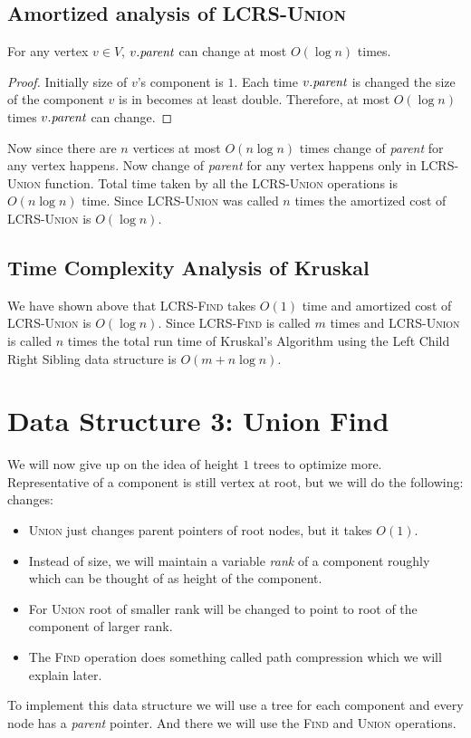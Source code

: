 \subsection{Amortized analysis of \textsc{LCRS-Union}}
\begin{lemma}{}{}
	For any vertex $v\in V$, $v.\emph{parent}$ can change at most $O(\log n)$ times.
\end{lemma}
\begin{proof}
	Initially size of $v$'s component is $1$. Each time $v.\emph{parent}$ is changed the size of the component $v$ is in becomes at least double. Therefore, at most $O(\log n)$ times $v.\emph{parent}$ can change.
\end{proof}\parinn

Now since there are $n$ vertices at most $O(n\log n)$ times change of \emph{parent} for any vertex happens. Now change of \emph{parent} for any vertex happens only in \textsc{LCRS-Union} function. Total time taken by all the \textsc{LCRS-Union} operations is $O(n\log n)$ time. Since \textsc{LCRS-Union} was called $n$ times the amortized cost of \textsc{LCRS-Union} is $O(\log n)$.
\subsection{Time Complexity Analysis of Kruskal}
We have shown above that \textsc{LCRS-Find} takes $O(1)$ time and amortized cost of \textsc{LCRS-Union} is $O(\log n)$. Since \textsc{LCRS-Find} is called $m$ times and \textsc{LCRS-Union} is called $n$ times the total run time of Kruskal's Algorithm using the Left Child Right Sibling data structure is $O(m+n\log n)$.
\section{Data Structure 3: Union Find}
We will now give up on the idea of height $1$ trees to optimize more. Representative of a component is still vertex at root, but we will do the following: changes:
\begin{itemize}
	\item \textsc{Union} just changes parent pointers of root nodes, but it takes $O(1)$.
	\item Instead of size, we will maintain a variable \emph{rank} of a component roughly which can be thought of as height of the component.
	\item For \textsc{Union} root of smaller rank will be changed to point to root of the component of larger rank.
	\item The \textsc{Find} operation does something called path compression which we will explain later.
\end{itemize}
To implement this data structure we will use a tree for each component and every node has a \emph{parent} pointer. And there we will use the \textsc{Find} and \textsc{Union} operations.

